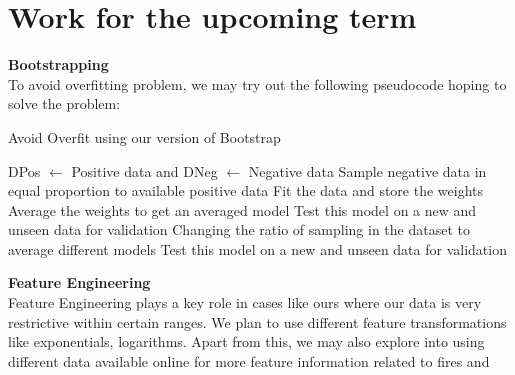 \documentclass{article}
\begin{document}
\section{Work for the upcoming term}
\textbf{Bootstrapping} \\
To avoid overfitting problem, we may try out the following pseudocode hoping to
solve the problem:
\begin{algorithm}
    \caption{Avoid Overfit using our version of Bootstrap}
    \begin{algorithmic}[lt]

        \STATE DPos $\leftarrow$ Positive data and DNeg $\leftarrow$ Negative
        data
        \STATE Sample negative data in equal proportion to available positive
        data
        \STATE Fit the data and store the weights
        \ENDFOR
        \STATE Average the weights to get an averaged model
        \STATE Test this model on a new and unseen data for validation
        \REQUIRE Changing the ratio of sampling in the dataset to average
        different models
        \STATE Test this model on a new and unseen data for validation
    \end{algorithmic}
\end{algorithm}

\textbf{Feature Engineering} \\
Feature Engineering plays a key role in cases like ours where our data is very
restrictive within certain ranges. We plan to use different feature
transformations like exponentials, logarithms. Apart from this, we may also
explore into using different data available online for more feature information
related to fires and
\end{document}
